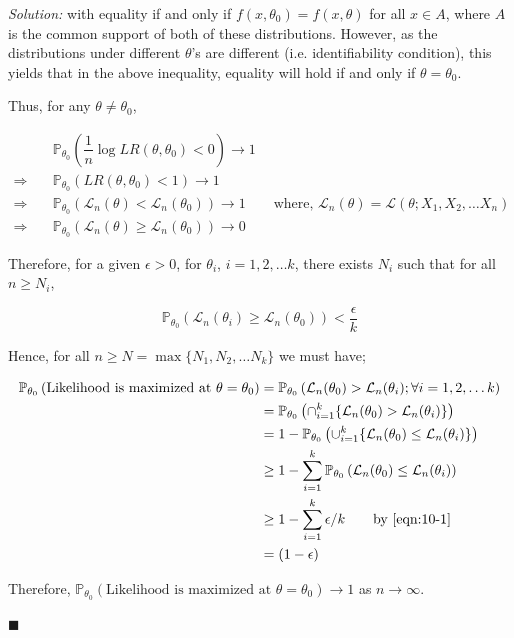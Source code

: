 \documentclass[12pt]{article}
\newcommand{\prob}{\mathbb{P}}
\theoremstyle{definition}
\newenvironment{answer}{\textit{Solution: }\quad }{ \hfill $\blacksquare$}
\numberwithin{equation}{section}
\begin{document}
\begin{answer}
    with equality if and only if $f(x, \theta_0) = f(x, \theta)$ for all $x \in A$, where $A$ is the common support of both of these distributions. However, as the distributions under different $\theta$'s are different (i.e. identifiability condition), this yields that in the above inequality, equality will hold if and only if $\theta = \theta_0$.

    Thus, for any $\theta \neq \theta_0$,

    \begin{align*}
        & \prob_{\theta_0} \left( \dfrac{1}{n}\log LR(\theta, \theta_0) < 0 \right) \rightarrow 1\\
        \Rightarrow \quad & \prob_{\theta_0} \left( LR(\theta, \theta_0) < 1 \right) \rightarrow 1\\
        \Rightarrow \quad & \prob_{\theta_0} \left( \mathcal{L}_n(\theta) < \mathcal{L}_n(\theta_0) \right) \rightarrow 1 \qquad \text{where, } \mathcal{L}_n(\theta) = \mathcal{L}(\theta; X_1, X_2, \dots X_n)\\
        \Rightarrow \quad & \prob_{\theta_0} \left( \mathcal{L}_n(\theta) \geq \mathcal{L}_n(\theta_0) \right) \rightarrow 0
    \end{align*}

    Therefore, for a given $\epsilon > 0$, for $\theta_i$, $i = 1, 2, \dots k$, there exists $N_i$ such that for all $n \geq N_i$, 

    \begin{equation}
        \prob_{\theta_0}(\mathcal{L}_n(\theta_i) \geq \mathcal{L}_n(\theta_0)) < \dfrac{\epsilon}{k}
        \label{eqn:10-1}        
    \end{equation}

    Hence, for all $n \geq N = \max\{ N_1, N_2, \dots N_k \}$ we must have;

    \begin{align*}
        \prob_{\theta_0} \left( \text{Likelihood is maximized at } \theta = \theta_0 \right)
        & = \prob_{\theta_0} \left( \mathcal{L}_n(\theta_0) > \mathcal{L}_n(\theta_i); \forall i = 1, 2, \dots k \right)\\
        & = \prob_{\theta_0} \left( \cap_{i=1}^{k} \{ \mathcal{L}_n(\theta_0) > \mathcal{L}_n(\theta_i)\} \right)\\
        & = 1 - \prob_{\theta_0} \left( \cup_{i=1}^{k} \{ \mathcal{L}_n(\theta_0) \leq \mathcal{L}_n(\theta_i)\} \right)\\
        & \geq 1 - \sum_{i = 1}^{k} \prob_{\theta_0} \left( \mathcal{L}_n(\theta_0) \leq \mathcal{L}_n(\theta_i) \right)\\
        & \geq 1 - \sum_{i=1}^{k} \epsilon/k \qquad \text{by \cref{eqn:10-1}}\\
        & = (1 - \epsilon)
    \end{align*}

    Therefore, $\prob_{\theta_0} \left( \text{Likelihood is maximized at } \theta = \theta_0 \right) \rightarrow 1$ as $n \rightarrow \infty$.

\end{answer}
\end{document}
